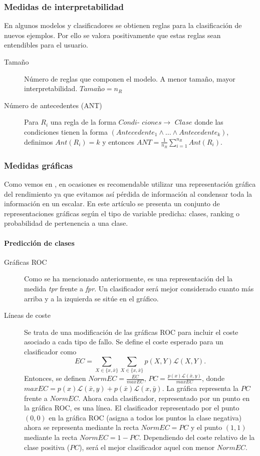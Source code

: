 \subsubsection*{Medidas de interpretabilidad} 
	En algunos modelos y clasificadores se obtienen reglas para la clasificación de nuevos ejemplos. Por ello se valora positivamente que estas reglas sean entendibles para el usuario. 
	\begin{description}
	\item[Tamaño] Número de reglas que componen el modelo. A menor tamaño, mayor interpretabilidad. $\textit{Tamaño} = n_R$
	\item[Número de antecedentes (ANT)] Para $R_i$ una regla de la forma $\textit{Condi-}$ ${ciones } \rightarrow \textit{ Clase}$ donde las condiciones tienen la forma $(Antecedente_1 \wedge \dots \wedge Antecedente_k)$, definimos $Ant(R_i) = k$ y entonces $ANT = \frac{1}{n_R} \sum\limits_{i=1}^{n_R} Ant(R_i)$.
	\end{description}


\subsubsection*{Medidas gráficas}

	Como vemos en \cite{PRATI11}, en ocasiones es recomendable utilizar una representación gráfica del rendimiento ya que evitamos así pérdida de información al condensar toda la información en un escalar. En este artículo se presenta un conjunto de representaciones gráficas según el tipo de variable predicha: clases, ranking o probabilidad de pertenencia a una clase.
	
\paragraph{Predicción de clases}
	\begin{description}
		\item[Gráficas ROC] Como se ha mencionado anteriormente, es una representación del la medida \textit{tpr} frente a \textit{fpr}. Un clasificador será mejor considerado cuanto más arriba y a la izquierda se sitúe en el gráfico. 
		\item[Líneas de coste] Se trata de una modificación de las gráficas ROC para incluir el coste asociado a cada tipo de fallo. Se define el coste esperado para un clasificador como 
		\[ EC = \sum\limits_{X \in \{x, \bar{x}\}} 
		 		\sum\limits_{X \in \{x, \bar{x}\}} 
		 			p(X,Y) \mathcal{L}(X,Y)			.\]
	Entonces, se definen $NormEC = \frac{EC}{maxEC}$, $PC = \frac{p(x) \mathcal{L}(\bar{x},y)}{maxEC}$, donde $maxEC = p(x)\mathcal{L}(\bar{x},y)+p(\bar{x})\mathcal{L}(x,\bar{y})$.  La gráfica representa la $PC$ frente a $NormEC$. Ahora cada clasificador, representado por un punto en la gráfica ROC, es una línea. El clasificador representado por el punto $(0,0)$ en la gráfica ROC (asigna a todos los puntos la clase negativa) ahora se representa mediante la recta $NormEC=PC$ y el punto $(1,1)$ mediante la recta $NormEC= 1-PC$. Dependiendo del coste relativo de la clase positiva ($PC$), será el mejor clasificador aquel con menor $NormEC$.
	\end{description}

